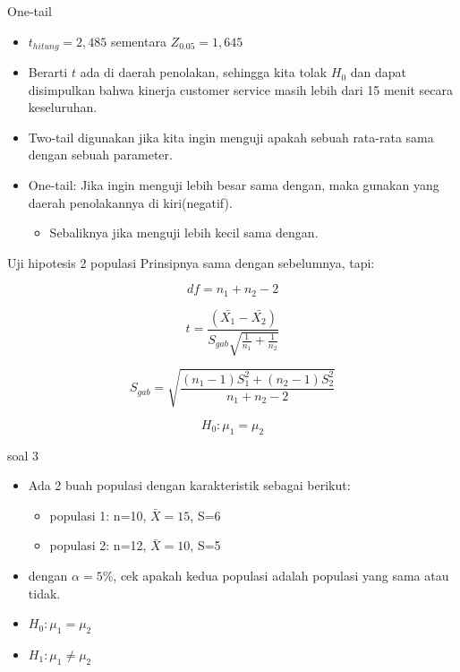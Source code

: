 \documentclass[
  ignorenonframetext,
]{beamer}
\providecommand{\tightlist}{%
  \setlength{\itemsep}{0pt}\setlength{\parskip}{0pt}}\usepackage{longtable,booktabs,array}
\begin{document}
\begin{frame}{One-tail}
\label{one-tail}
\begin{itemize}
\item
  \(t_{hitung}=2,485\) sementara \(Z_{0.05}=1,645\)
\item
  Berarti \(t\) ada di daerah penolakan, sehingga kita tolak \(H_0\) dan
  dapat disimpulkan bahwa kinerja customer service masih lebih dari 15
  menit secara keseluruhan.
\item
  Two-tail digunakan jika kita ingin menguji apakah sebuah rata-rata
  sama dengan sebuah parameter.
\item
  One-tail: Jika ingin menguji lebih besar sama dengan, maka gunakan
  yang daerah penolakannya di kiri(negatif).

  \begin{itemize}
  \tightlist
  \item
    Sebaliknya jika menguji lebih kecil sama dengan.
  \end{itemize}
\end{itemize}
\end{frame}

\begin{frame}{Uji hipotesis 2 populasi}
\label{uji-hipotesis-2-populasi}
Prinsipnya sama dengan sebelumnya, tapi:

\[
df=n_1+n_2-2
\]

\[
t=\frac{(\bar{X_1}-\bar{X_2})}{S_{gab}\sqrt{\frac{1}{n_1}+\frac{1}{n_2}}}
\]

\[
S_{gab}=\sqrt{\frac{(n_1-1)S_1^2+(n_2-1)S_2^2}{n_1+n_2-2}}
\]

\[
H_0: \mu_1=\mu_2
\]
\end{frame}

\begin{frame}{soal 3}
\label{soal-3-1}
\begin{itemize}
\item
  Ada 2 buah populasi dengan karakteristik sebagai berikut:

  \begin{itemize}
  \item
    populasi 1: n=10, \(\bar{X}=15\), S=6
  \item
    populasi 2: n=12, \(\bar{X}=10\), S=5
  \end{itemize}
\item
  dengan \(\alpha=5\%\), cek apakah kedua populasi adalah populasi yang
  sama atau tidak.
\item
  \(H_0: \mu_1 = \mu_2\)
\item
  \(H_1: \mu_1 \neq \mu_2\)
\end{itemize}
\end{frame}
\end{document}
